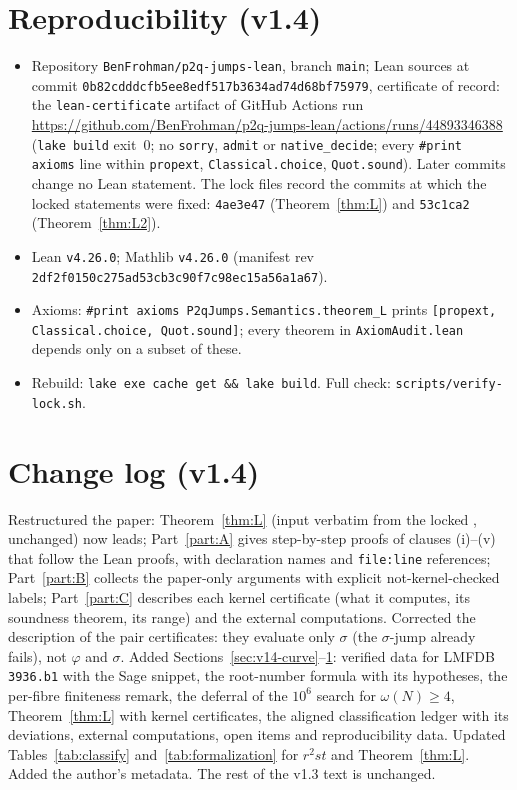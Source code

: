 \documentclass[11pt,reqno]{amsart}
\newcommand{\ph}{\varphi}
\newcommand{\sig}{\sigma}
\theoremstyle{definition}
\begin{document}
\section{Reproducibility (v1.4)}
\label{sec:v14-repro}
\begin{itemize}
\item Repository \texttt{BenFrohman/p2q-jumps-lean}, branch \texttt{main}; Lean sources at commit \texttt{0b82cddd\allowbreak{}cfb5ee8edf\allowbreak{}517b3634ad\allowbreak{}74d68bf759\allowbreak{}79}, certificate of record: the \texttt{lean-certificate} artifact of GitHub Actions run \url{https://github.com/BenFrohman/p2q-jumps-lean/actions/runs/44893346388} (\texttt{lake build} exit~0; no \texttt{sorry}, \texttt{admit} or \texttt{native\_decide}; every \texttt{\#print axioms} line within \texttt{propext}, \texttt{Classical.choice}, \texttt{Quot.sound}). Later commits change no Lean statement. The lock files record the commits at which the locked statements were fixed: \texttt{4ae3e47} (Theorem~\ref{thm:L}) and \texttt{53c1ca2} (Theorem~\ref{thm:L2}).
\item Lean \texttt{v4.26.0}; Mathlib \texttt{v4.26.0} (manifest rev \texttt{2df2f0150c\allowbreak{}275ad53cb3\allowbreak{}c90f7c98ec\allowbreak{}15a56a1a67}).
\item Axioms: \texttt{\#print axioms P2qJumps.Semantics.theorem\_L} prints \texttt{[propext, Classical.choice, Quot.sound]}; every theorem in \texttt{AxiomAudit.lean} depends only on a subset of these.
\item Rebuild: \texttt{lake exe cache get \&\& lake build}. Full check: \texttt{scripts/verify-lock.sh}.
\end{itemize}

\section*{Change log (v1.4)}
Restructured the paper: Theorem~\ref{thm:L} (input verbatim from the locked , unchanged) now leads; Part~\ref{part:A} gives step-by-step proofs of clauses (i)--(v) that follow the Lean proofs, with declaration names and \texttt{file:line} references; Part~\ref{part:B} collects the paper-only arguments with explicit not-kernel-checked labels; Part~\ref{part:C} describes each kernel certificate (what it computes, its soundness theorem, its range) and the external computations. Corrected the description of the pair certificates: they evaluate only \(\sig\) (the \(\sig\)-jump already fails), not \(\ph\) and \(\sig\). Added Sections~\ref{sec:v14-curve}--\ref{sec:v14-repro}: verified data for LMFDB \texttt{3936.b1} with the Sage snippet, the root-number formula with its hypotheses, the per-fibre finiteness remark, the deferral of the \(10^6\) search for \(\omega(N)\ge 4\), Theorem~\ref{thm:L} with kernel certificates, the aligned classification ledger with its deviations, external computations, open items and reproducibility data. Updated Tables~\ref{tab:classify} and~\ref{tab:formalization} for \(r^2st\) and Theorem~\ref{thm:L}. Added the author's metadata. The rest of the v1.3 text is unchanged.
\end{document}
